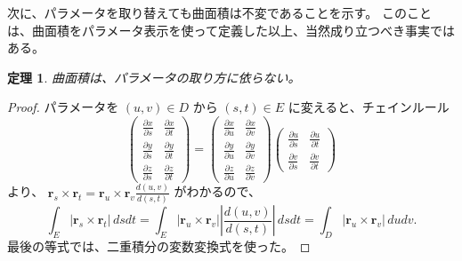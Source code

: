 \documentclass[a4paper]{jsarticle}
\newtheorem{Theorem}{定理}[section]
\theoremstyle{definition}
\theoremstyle{remark}
\newcommand{\R}{\text{\ym R}}
\begin{document}

次に、パラメータを取り替えても曲面積は不変であることを示す。
このことは、曲面積をパラメータ表示を使って定義した以上、当然成り立つべき事実ではある。

\begin{Theorem}
曲面積は、パラメータの取り方に依らない。
\end{Theorem}

\begin{proof}
  パラメータを $(u,v) \in D$ から $(s,t) \in E$ に変えると、チェインルール
  \[
    \begin{pmatrix}
      \frac{\partial x}{\partial s} & \frac{\partial x}{\partial t}\\
      \frac{\partial y}{\partial s} & \frac{\partial y}{\partial t}\\
       \frac{\partial z}{\partial s} & \frac{\partial z}{\partial t}     
    \end{pmatrix}
  =   \begin{pmatrix}
      \frac{\partial x}{\partial u} & \frac{\partial x}{\partial v}\\
      \frac{\partial y}{\partial u} & \frac{\partial y}{\partial v}\\
       \frac{\partial z}{\partial u} & \frac{\partial z}{\partial v}     
      \end{pmatrix}
      \begin{pmatrix}
        \frac{\partial u}{\partial s} & \frac{\partial u}{\partial t}\\
        \frac{\partial v}{\partial s} & \frac{\partial v}{\partial t}
      \end{pmatrix}
  \]
  より、
  $\displaystyle
    {\boldsymbol r}_s \times {\boldsymbol r}_t
    = {\boldsymbol r}_u \times {\boldsymbol r}_v \frac{d(u,v)}{d(s,t)}$ 
  がわかるので、
  \[
  \int_E |{\boldsymbol r}_s \times {\boldsymbol r}_t|\, dsdt
  = \int_E |{\boldsymbol r}_u \times {\boldsymbol r}_v| \left|\frac{d(u,v)}{d(s,t)}\right|\, dsdt
  = \int_D |{\boldsymbol r}_u \times {\boldsymbol r}_v|\, dudv. 
\]
最後の等式では、二重積分の変数変換式を使った。
\end{proof}
\end{document}
